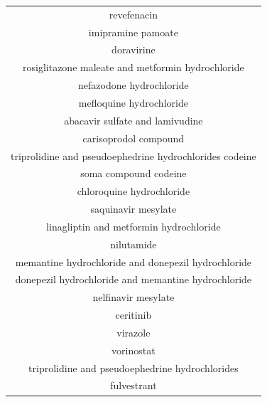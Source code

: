 \documentclass{article}
\newcommand{\lgc}[1]{\cellcolor[gray]{0.85}#1}
\begin{document}
\begin{table}[p]
\begin{tabular}[t]{c}
revefenacin \\
imipramine pamoate \\
doravirine \\
rosiglitazone maleate and metformin hydrochloride \\
nefazodone hydrochloride \\
\lgc{mefloquine hydrochloride\cite{Weston2020.03.25.008482}} \\
abacavir sulfate and lamivudine \\
carisoprodol compound \\
triprolidine and pseudoephedrine hydrochlorides codeine \\
soma compound codeine \\
\lgc{chloroquine hydrochloride\cite{wang2020remdesivir}} \\
\lgc{saquinavir mesylate\cite{Farag2020}} \\
linagliptin and metformin hydrochloride \\
nilutamide \\
\lgc{memantine hydrochloride and donepezil hydrochloride\cite{rejdak2020adamantanes}} \\
\lgc{donepezil hydrochloride and memantine hydrochloride\cite{rejdak2020adamantanes}} \\
\lgc{nelfinavir mesylate\cite{Xu2020.01.27.921627}} \\
ceritinib \\
\lgc{virazole\cite{khalili2020novel}} \\
vorinostat \\
triprolidine and pseudoephedrine hydrochlorides \\
fulvestrant \\
\hline
\end{tabular}
\end{table}
\end{document}
